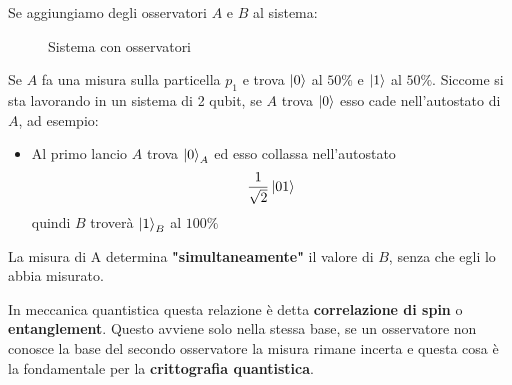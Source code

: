 \documentclass[a4paper]{article}
\begin{document}
\vspace{1em}
\noindent
Se aggiungiamo degli osservatori \( A \) e \( B \) al sistema:
\begin{figure}[H]
  \centering
  \caption{Sistema con osservatori}
\end{figure}
\noindent
Se \( A \) fa una misura sulla particella \( p_1 \) e trova \( \ket{0} \) al \( 50\% \) e
\( \ket{1} \) al \( 50\% \). Siccome si sta lavorando in un sistema di 2 qubit, se \( A \)
trova \( \ket{0} \) esso cade nell'autostato di \( A \), ad esempio:
\begin{itemize}
  \item Al primo lancio \( A \) trova \( \ket{0}_A \) ed esso collassa nell'autostato
    \[
      \frac{1}{\sqrt{2}} \ket{01}
    \] 
    quindi \( B \) troverà \( \ket{1}_B \) al \( 100\% \)
\end{itemize}
La misura di A determina \textbf{"simultaneamente"} il valore di \( B \), senza che egli
lo abbia misurato.

\vspace{1em}
\noindent
In meccanica quantistica questa relazione è detta \textbf{correlazione di spin}
o \textbf{entanglement}. Questo avviene solo nella stessa base, se un osservatore non
conosce la base del secondo osservatore la misura rimane incerta e questa cosa è la
fondamentale per la \textbf{crittografia quantistica}.
\end{document}
